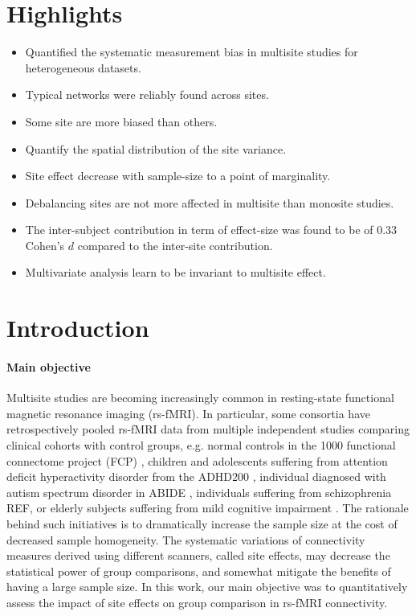 \documentclass[authoryear]{elsarticle}
\begin{document}

\section*{Highlights}

\begin{itemize}
\item Quantified the systematic measurement bias in multisite studies for heterogeneous datasets. 
\item Typical networks were reliably found across sites.
\item Some site are more biased than others.
\item Quantify the spatial distribution of the site variance.
\item Site effect decrease with sample-size to a point of marginality.
\item Debalancing sites are not more affected in multisite than monosite studies.
\item The inter-subject contribution in term of effect-size was found to be of 0.33 Cohen's $d$ compared to the inter-site contribution.
\item Multivariate analysis learn to be invariant to multisite effect.
\end{itemize}

\section{Introduction}

\paragraph{Main objective}
Multisite studies are becoming increasingly common in resting-state functional magnetic resonance imaging (rs-fMRI). In particular, some consortia have retrospectively pooled rs-fMRI data from multiple independent studies comparing clinical cohorts with control groups, e.g. normal controls in the 1000 functional connectome project (FCP) \citep{Biswal2010}, children and adolescents suffering from attention deficit hyperactivity disorder from the ADHD200 \citep{ADHD200,Fair2012}, individual diagnosed with autism spectrum disorder in ABIDE \citep{Nielsen2013}, individuals suffering from schizophrenia REF, or elderly subjects suffering from mild cognitive impairment \citep{Tam2015}. The rationale behind such initiatives is to dramatically increase the sample size at the cost of decreased sample homogeneity. The systematic variations of connectivity measures derived using different scanners, called site effects, may decrease the statistical power of group comparisons, and somewhat mitigate the benefits of having a large sample size. In this work, our main objective was to quantitatively assess the impact of site effects on group comparison in rs-fMRI connectivity.
\end{document}

